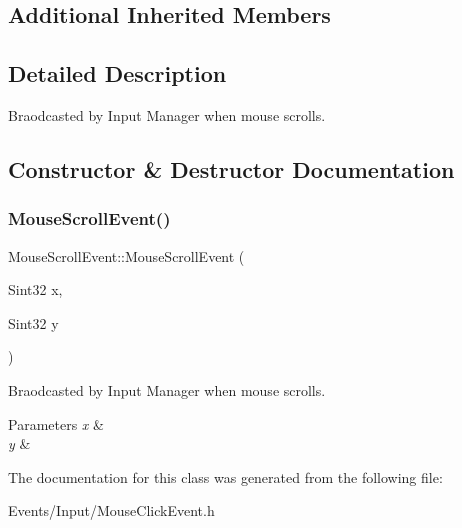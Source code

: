 \subsection*{Additional Inherited Members}


\subsection{Detailed Description}
Braodcasted by Input Manager when mouse scrolls. 

\subsection{Constructor \& Destructor Documentation}
\mbox{\label{classMouseScrollEvent_a3938241efa68cba150c7c9957b447258}} 
\subsubsection{\texorpdfstring{Mouse\+Scroll\+Event()}{MouseScrollEvent()}}
{\footnotesize\ttfamily Mouse\+Scroll\+Event\+::\+Mouse\+Scroll\+Event (\begin{DoxyParamCaption}\item[{Sint32}]{x,  }\item[{Sint32}]{y }\end{DoxyParamCaption})\hspace{0.3cm}{\ttfamily [inline]}}



Braodcasted by Input Manager when mouse scrolls. 


\begin{DoxyParams}{Parameters}
{\em x} & \\
\hline
{\em y} & \\
\hline
\end{DoxyParams}


The documentation for this class was generated from the following file\+:\begin{DoxyCompactItemize}
\item 
Events/\+Input/Mouse\+Click\+Event.\+h\end{DoxyCompactItemize}
